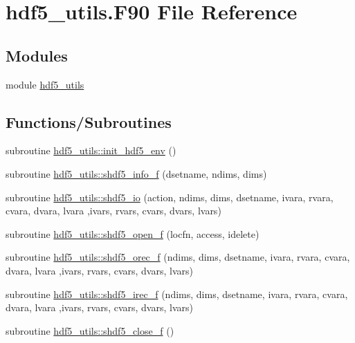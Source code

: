 \hypertarget{utils_2hdf5__utils_8f90}{}\section{hdf5\+\_\+utils.\+F90 File Reference}
\label{utils_2hdf5__utils_8f90}
\subsection*{Modules}
\begin{DoxyCompactItemize}
\item 
module \hyperlink{namespacehdf5__utils}{hdf5\+\_\+utils}
\end{DoxyCompactItemize}
\subsection*{Functions/\+Subroutines}
\begin{DoxyCompactItemize}
\item 
subroutine \hyperlink{namespacehdf5__utils_a9a97906ff616832a39ef05421cab83bb}{hdf5\+\_\+utils\+::init\+\_\+hdf5\+\_\+env} ()
\item 
subroutine \hyperlink{namespacehdf5__utils_a5149c551d73478f502b8660e3bdbd5b8}{hdf5\+\_\+utils\+::shdf5\+\_\+info\+\_\+f} (dsetname, ndims, dims)
\item 
subroutine \hyperlink{namespacehdf5__utils_ab16be1368bf81b1ead660310e178c07e}{hdf5\+\_\+utils\+::shdf5\+\_\+io} (action, ndims, dims, dsetname, ivara, rvara, cvara, dvara, lvara                                                                                                                                                                                       ,ivars, rvars, cvars, dvars, lvars)
\item 
subroutine \hyperlink{namespacehdf5__utils_ab621eee22271edfd3bf37b44d5b657e6}{hdf5\+\_\+utils\+::shdf5\+\_\+open\+\_\+f} (locfn, access, idelete)
\item 
subroutine \hyperlink{namespacehdf5__utils_a891a04f6033e6bcf3a91697ca1ab207b}{hdf5\+\_\+utils\+::shdf5\+\_\+orec\+\_\+f} (ndims, dims, dsetname, ivara, rvara, cvara, dvara, lvara                                                                                                                                                                   ,ivars, rvars, cvars, dvars, lvars)
\item 
subroutine \hyperlink{namespacehdf5__utils_a468d6b6ee8d5f6b95c49d383e6661ef6}{hdf5\+\_\+utils\+::shdf5\+\_\+irec\+\_\+f} (ndims, dims, dsetname, ivara, rvara, cvara, dvara, lvara                                                                                                                                                                   ,ivars, rvars, cvars, dvars, lvars)
\item 
subroutine \hyperlink{namespacehdf5__utils_aced9a0b34d2b1e59a1867be622a7c8a4}{hdf5\+\_\+utils\+::shdf5\+\_\+close\+\_\+f} ()
\end{DoxyCompactItemize}
